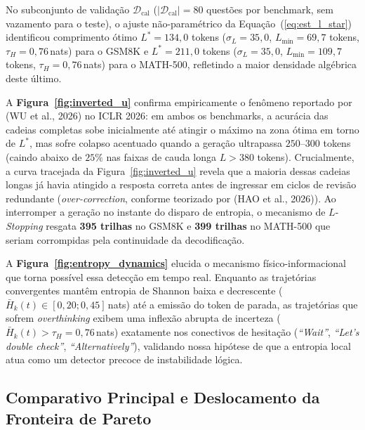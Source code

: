 \documentclass[9pt,conference]{IEEEtran}
\begin{document}
No subconjunto de valida\c{c}\~{a}o $\mathcal{D}_{\text{cal}}$ ($|\mathcal{D}_{\text{cal}}| = 80$ quest\~{o}es por benchmark, sem vazamento para o teste), o ajuste n\~{a}o-param\'{e}trico da Equa\c{c}\~{a}o~(\ref{eq:est_l_star}) identificou comprimento \'{o}timo $L^* = 134,0$ tokens ($\sigma_L = 35,0$, $L_{\min} = 69,7$ tokens, $\tau_H = 0,76$\,nats) para o GSM8K e $L^* = 211,0$ tokens ($\sigma_L = 35,0$, $L_{\min} = 109,7$ tokens, $\tau_H = 0,76$\,nats) para o MATH-500, refletindo a maior densidade alg\'{e}brica deste \'{u}ltimo.

A \textbf{Figura~\ref{fig:inverted_u}} confirma empiricamente o fen\^{o}meno reportado por (WU et al., 2026) no ICLR 2026: em ambos os benchmarks, a acur\'{a}cia das cadeias completas sobe inicialmente at\'{e} atingir o m\'{a}ximo na zona \'{o}tima em torno de $L^*$, mas sofre colapso acentuado quando a gera\c{c}\~{a}o ultrapassa $250$--$300$ tokens (caindo abaixo de $25\%$ nas faixas de cauda longa $L > 380$ tokens). Crucialmente, a curva tracejada da Figura~\ref{fig:inverted_u} revela que a maioria dessas cadeias longas j\'{a} havia atingido a resposta correta antes de ingressar em ciclos de revis\~{a}o redundante (\textit{over-correction}, conforme teorizado por (HAO et al., 2026)). Ao interromper a gera\c{c}\~{a}o no instante do disparo de entropia, o mecanismo de $L$-\textit{Stopping} resgata \textbf{395 trilhas} no GSM8K e \textbf{399 trilhas} no MATH-500 que seriam corrompidas pela continuidade da decodifica\c{c}\~{a}o.

A \textbf{Figura~\ref{fig:entropy_dynamics}} elucida o mecanismo f\'{i}sico-informacional que torna poss\'{i}vel essa detec\c{c}\~{a}o em tempo real. Enquanto as trajet\'{o}rias convergentes mant\^{e}m entropia de Shannon baixa e decrescente ($\bar{H}_k(t) \in [0,20; 0,45]$\,nats) at\'{e} a emiss\~{a}o do token de parada, as trajet\'{o}rias que sofrem \textit{overthinking} exibem uma inflex\~{a}o abrupta de incerteza ($\bar{H}_k(t) > \tau_H = 0,76$\,nats) exatamente nos conectivos de hesita\c{c}\~{a}o (\textit{``Wait''}, \textit{``Let's double check''}, \textit{``Alternatively''}), validando nossa hip\'{o}tese de que a entropia local atua como um detector precoce de instabilidade l\'{o}gica.

\subsection{Comparativo Principal e Deslocamento da Fronteira de Pareto}
\end{document}
